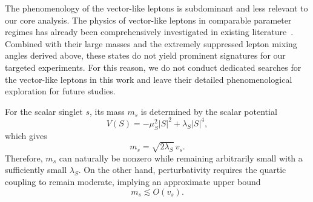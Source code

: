 \documentclass[onecolumn, aps, nofootinbib, prd, preprint, floats, floatfix, amsmath, amssymb, superscriptaddress, preprintnumbers]{revtex4-1}
\begin{document}

The phenomenology of the vector-like leptons is subdominant and less relevant to our core analysis. The physics of vector-like leptons in comparable parameter regimes has already been comprehensively investigated in existing literature~\cite{Cao:2023smj,Yue:2026tbc,Yue:2025xvk,Yue:2024sds}. Combined with their large masses and the extremely suppressed lepton mixing angles derived above, these states do not yield prominent signatures for our targeted experiments. For this reason, we do not conduct dedicated searches for the vector-like leptons in this work and leave their detailed phenomenological exploration for future studies.

For the scalar singlet $s$, its mass $m_s$ is determined by the scalar potential
\begin{equation}
V(S) = -\mu_S^2 |S|^2 + \lambda_S |S|^4,
\end{equation}
which gives
\begin{equation}
m_s=\sqrt{2\lambda_S}\,v_s.
\end{equation}
Therefore, $m_s$ can naturally be nonzero while remaining arbitrarily small with a sufficiently small $\lambda_S$. On the other hand, perturbativity requires the quartic coupling to remain moderate, implying an approximate upper bound
\begin{equation}
m_s \lesssim O(v_s).
\end{equation}
\end{document}
